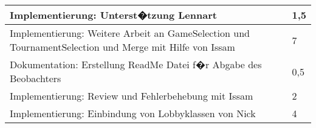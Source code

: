 \documentclass[a4paper,11pt]{scrartcl}
\begin{document}
\begin{longtable}{| p{13.8cm} | C{2.4cm} |}
  Implementierung: Unterst�tzung Lennart
	&
  1,5
	\\
	\hline

  Implementierung: Weitere Arbeit an GameSelection und TournamentSelection und Merge mit Hilfe von Issam
	&
  7
	\\
	\hline

  Dokumentation: Erstellung ReadMe Datei f�r Abgabe des Beobachters
	&
  0,5
	\\
	\hline

  Implementierung: Review und Fehlerbehebung mit Issam
	&
  2
	\\
	\hline

  Implementierung: Einbindung von Lobbyklassen von Nick
	&
  4
	\\
	\hline


\end{longtable}
\end{document}
